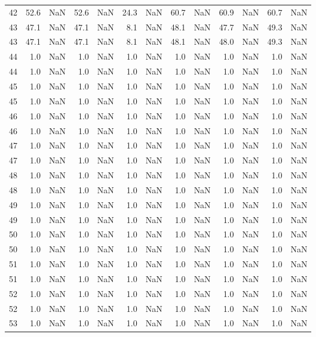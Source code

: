 \begin{tabular}{lrrrrrrrrrrrr}
42 & 52.6 & NaN & 52.6 & NaN & 24.3 & NaN & 60.7 & NaN & 60.9 & NaN & 60.7 & NaN \\
43 & 47.1 & NaN & 47.1 & NaN & 8.1 & NaN & 48.1 & NaN & 47.7 & NaN & 49.3 & NaN \\
43 & 47.1 & NaN & 47.1 & NaN & 8.1 & NaN & 48.1 & NaN & 48.0 & NaN & 49.3 & NaN \\
44 & 1.0 & NaN & 1.0 & NaN & 1.0 & NaN & 1.0 & NaN & 1.0 & NaN & 1.0 & NaN \\
44 & 1.0 & NaN & 1.0 & NaN & 1.0 & NaN & 1.0 & NaN & 1.0 & NaN & 1.0 & NaN \\
45 & 1.0 & NaN & 1.0 & NaN & 1.0 & NaN & 1.0 & NaN & 1.0 & NaN & 1.0 & NaN \\
45 & 1.0 & NaN & 1.0 & NaN & 1.0 & NaN & 1.0 & NaN & 1.0 & NaN & 1.0 & NaN \\
46 & 1.0 & NaN & 1.0 & NaN & 1.0 & NaN & 1.0 & NaN & 1.0 & NaN & 1.0 & NaN \\
46 & 1.0 & NaN & 1.0 & NaN & 1.0 & NaN & 1.0 & NaN & 1.0 & NaN & 1.0 & NaN \\
47 & 1.0 & NaN & 1.0 & NaN & 1.0 & NaN & 1.0 & NaN & 1.0 & NaN & 1.0 & NaN \\
47 & 1.0 & NaN & 1.0 & NaN & 1.0 & NaN & 1.0 & NaN & 1.0 & NaN & 1.0 & NaN \\
48 & 1.0 & NaN & 1.0 & NaN & 1.0 & NaN & 1.0 & NaN & 1.0 & NaN & 1.0 & NaN \\
48 & 1.0 & NaN & 1.0 & NaN & 1.0 & NaN & 1.0 & NaN & 1.0 & NaN & 1.0 & NaN \\
49 & 1.0 & NaN & 1.0 & NaN & 1.0 & NaN & 1.0 & NaN & 1.0 & NaN & 1.0 & NaN \\
49 & 1.0 & NaN & 1.0 & NaN & 1.0 & NaN & 1.0 & NaN & 1.0 & NaN & 1.0 & NaN \\
50 & 1.0 & NaN & 1.0 & NaN & 1.0 & NaN & 1.0 & NaN & 1.0 & NaN & 1.0 & NaN \\
50 & 1.0 & NaN & 1.0 & NaN & 1.0 & NaN & 1.0 & NaN & 1.0 & NaN & 1.0 & NaN \\
51 & 1.0 & NaN & 1.0 & NaN & 1.0 & NaN & 1.0 & NaN & 1.0 & NaN & 1.0 & NaN \\
51 & 1.0 & NaN & 1.0 & NaN & 1.0 & NaN & 1.0 & NaN & 1.0 & NaN & 1.0 & NaN \\
52 & 1.0 & NaN & 1.0 & NaN & 1.0 & NaN & 1.0 & NaN & 1.0 & NaN & 1.0 & NaN \\
52 & 1.0 & NaN & 1.0 & NaN & 1.0 & NaN & 1.0 & NaN & 1.0 & NaN & 1.0 & NaN \\
53 & 1.0 & NaN & 1.0 & NaN & 1.0 & NaN & 1.0 & NaN & 1.0 & NaN & 1.0 & NaN \\

\end{tabular}
